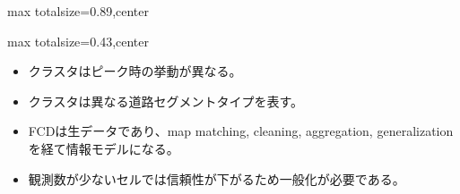 \begin{minipage}[t]{0.58\textwidth}
\begin{adjustbox}{max totalsize={\textwidth}{0.89\textheight},center}
\begin{minipage}{\textwidth}
\end{minipage}
\end{adjustbox}
\end{minipage}


\clearpage
{}
\begin{minipage}[t]{0.405\textwidth}
\begin{adjustbox}{max totalsize={\textwidth}{0.43\textheight},center}
\begin{minipage}{\textwidth}\scriptsize
{}\begin{itemize}
\item クラスタはピーク時の挙動が異なる。
\item クラスタは異なる道路セグメントタイプを表す。
\end{itemize}\begin{itemize}
\item FCDは生データであり、map matching, cleaning, aggregation, generalization を経て情報モデルになる。
\item 観測数が少ないセルでは信頼性が下がるため一般化が必要である。
\end{itemize}
\end{minipage}
\end{adjustbox}
\end{minipage}\hfill
